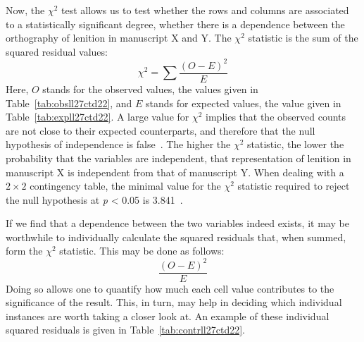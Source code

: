 Now, the \(\chi^2\) test allows us to test whether the rows and columns are associated to a statistically significant degree, \ie whether there is a dependence between the orthography of lenition in manuscript X and Y. The \(\chi^2\) statistic is the sum of the squared residual values:
\[\chi^2=\sum{\frac{(O-E)^2}{E}}\]
Here, \(O\) stands for the observed values, \eg the values given in Table~\ref{tab:obsll27ctd22}, and \(E\) stands for expected values, \eg the value given in Table~\ref{tab:expll27ctd22}. A large value for \(\chi^2\) implies that the observed counts are not close to their expected counterparts, and therefore that the null hypothesis of independence is false~\autocite[756--757]{MS_Statistics09}. The higher the \(\chi^2\) statistic, the lower the probability that the variables are independent, \eg that representation of lenition in manuscript X is independent from that of manuscript Y. When dealing with a \(2 \times 2\) contingency table, the minimal value for the \(\chi^2\) statistic required to reject the null hypothesis at \textit{p} < 0.05 is 3.841~\autocite[798]{MS_Statistics09}.

If we find that a dependence between the two variables indeed exists, it may be worthwhile to individually calculate the squared residuals that, when summed, form the \(\chi^2\) statistic. This may be done as follows:
\[\frac{(O-E)^2}{E}\]
Doing so allows one to quantify how much each cell value contributes to the significance of the result. This, in turn, may help in deciding which individual instances are worth taking a closer look at. An example of these individual squared residuals is given in Table~\ref{tab:contrll27ctd22}.


